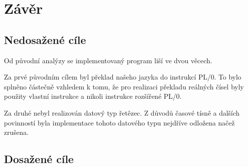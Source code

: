 \documentclass[
12pt,
a4paper,
pdftex,
czech,
titlepage
]{report}
\begin{document}
\chapter{Závěr}

\section{Nedosažené cíle}
Od původní analýzy se implementovaný program liší ve dvou věcech.

 Za prvé původním cílem byl překlad našeho jazyka do instrukcí PL/0. To bylo splněno částečně vzhledem k tomu, že pro realizaci překladu reálných čísel byly použity vlastní instrukce a nikoli instrukce rozšířené PL/0.
 
 Za druhé nebyl realizován datový typ řetězec. Z důvodů časové tísně a dalších povinností byla implementace tohoto datového typu nejdříve odložena načež zrušena. 

\section{Dosažené cíle}
\end{document}
